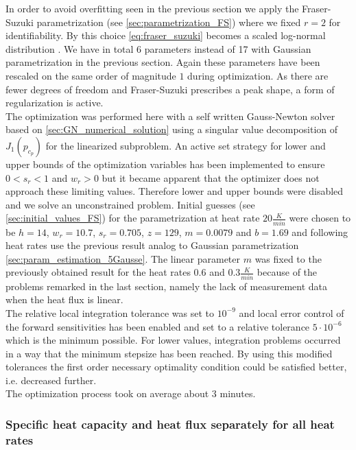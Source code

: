 \documentclass{scrartcl}[12pt, halfparskip]
\numberwithin{equation}{section}
\numberwithin{figure}{section}
\numberwithin{table}{section}
\begin{document}
In order to avoid overfitting seen in the previous section we apply the Fraser-Suzuki parametrization (see \cref{sec:parametrization_FS}) where we fixed $r=2$ for identifiability. By this choice \cref{eq:fraser_suzuki} becomes a scaled log-normal distribution \cite{fraser_suzuki_1}.
We have in total 6 parameters instead of 17 with Gaussian parametrization in the previous section. 
Again these parameters have been rescaled on the same order of magnitude $1$ during optimization.
As there are fewer degrees of freedom and Fraser-Suzuki prescribes a peak shape, a form of regularization is active. \\
The optimization was performed here with a self written Gauss-Newton solver based on \cref{sec:GN_numerical_solution} using a singular value decomposition of $J_1(p_{c_p})$ for the linearized subproblem. 
An active set strategy for lower and upper bounds of the optimization variables has been implemented to ensure $0 < s_r < 1$ and $w_r > 0$ but it became apparent that the optimizer does not approach these limiting values. Therefore lower and upper bounds were disabled and we solve an unconstrained problem. Initial guesses (see \cref{sec:initial_values_FS}) for the parametrization at heat rate $20 \frac{K}{min}$ were chosen to be $h=14$, $w_r=10.7$, $s_r=0.705$, $z=129$, $m=0.0079$ and $b=1.69$ and following heat rates use the previous result analog to Gaussian parametrization \cref{sec:param_estimation_5Gausse}. The linear parameter $m$ was fixed to the previously obtained result for the heat rates $0.6$ and $0.3 \frac{K}{min}$ because of the problems remarked in the last section, namely the lack of measurement data when the heat flux is linear. \\
The relative local integration tolerance was set to $10^{-9}$ and local error control of the forward sensitivities has been enabled and set to a relative tolerance $5\cdot 10^{-6}$ which is the minimum possible. For lower values, integration problems occurred in a way that the minimum stepsize has been reached. By using this modified tolerances the first order necessary optimality condition could be satisfied better, i.e. decreased further. \\
The optimization process took on average about $3$ minutes.


\subsubsection{Specific heat capacity and heat flux separately for all heat rates}
\end{document}
